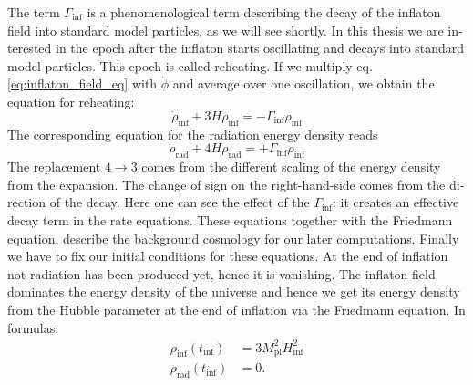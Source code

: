 \documentclass[master,       %
               twoside,        %
               BCOR10mm,       %
               english,ngerman, %
               ]{GAUBM}
\begin{document}
\begin{otherlanguage}{english}
The term $\Gamma_\mathrm{inf}$ is a phenomenological term describing the decay of the inflaton field into standard model particles, as we will see shortly. In this thesis we are interested in the epoch after the inflaton starts oscillating and decays into standard model particles. This epoch is called reheating.
If we multiply eq. \eqref{eq:inflaton_field_eq} with $\dot{\phi}$ and average over one oscillation, we obtain
the equation for reheating:
\begin{equation}
	\label{eq:cont_eq_inf}
	\boxed{
	\dot{\rho}_\mathrm{inf} + 3 H \rho_\mathrm{inf} = - \Gamma_\mathrm{inf} \rho_\mathrm{inf}
	}
\end{equation}
The corresponding equation for the radiation energy density reads
\begin{equation}
	\label{eq:cont_eq_rad}
	\boxed{
	\dot{\rho}_\mathrm{rad} + 4 H \rho_\mathrm{rad} = + \Gamma_\mathrm{inf} \rho_\mathrm{inf}
	}
\end{equation}
The replacement $4 \to 3$ comes from the different scaling of the energy density from the expansion. The change of sign on the right-hand-side comes from the direction of the decay. Here one can see the effect of the $\Gamma_{\mathrm{inf}}$: it creates an effective decay term in the rate equations.
These equations together with the Friedmann equation, describe the background cosmology for our later computations.
Finally we have to fix our initial conditions for these equations.
At the end of inflation not radiation has been produced yet, hence it is vanishing.
The inflaton field dominates the energy density of the universe and hence we get its energy density from the Hubble parameter at the end of inflation via the Friedmann equation.
In formulas:
\begin{align}
	\rho_\mathrm{inf}(t_\mathrm{inf}) &= 3 M_\mathrm{pl}^2 H_\mathrm{inf}^2 \nonumber \\
	\rho_\mathrm{rad}(t_\mathrm{inf}) &= 0.
\end{align}


\end{otherlanguage}
\end{document}

